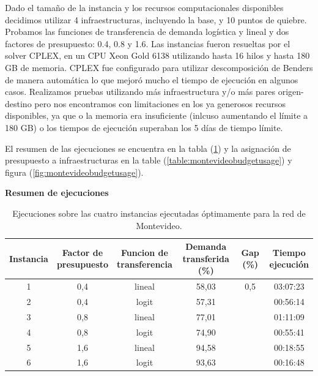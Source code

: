 \documentclass{article}
\begin{document}
  Dado el tamaño de la instancia y los recursos computacionales disponibles decidimos utilizar 4 infraestructuras, incluyendo la base, y 10 puntos de quiebre. Probamos las funciones de transferencia de demanda logística y lineal y dos factores de presupuesto: 0.4, 0.8 y 1.6. Las instancias fueron resueltas por el solver CPLEX, en un CPU Xeon Gold 6138 utilizando hasta 16 hilos y hasta 180 GB de memoria. CPLEX fue configurado para utilizar descomposición de Benders de manera automática lo que mejoró mucho el tiempo de ejecución en algunos casos. Realizamos pruebas utilizando más infraestructura y/o más pares origen-destino pero nos encontramos con limitaciones en los ya generosos recursos disponibles, ya que o la memoria era insuficiente (inlcuso aumentando el límite a 180 GB) o los tiempos de ejecución superaban los 5 días de tiempo límite.

  El resumen de las ejecuciones se encuentra en la tabla (\ref{table:montevideoexecutions}) y la asignación de presupuesto a infraestructuras en la table (\ref{table:montevideobudgetusage}) y figura (\ref{fig:montevideobudgetusage}).

  \begin{table}[h!]
    \centering
    \caption*{{\bf Resumen de ejecuciones}}
    \begin{tabular}{cccccc}
      \toprule
        Instancia & \shortstack{Factor de \\ presupuesto} & \shortstack{Funcion de \\ transferencia} & \shortstack{Demanda \\ transferida (\%)} & Gap (\%) & \shortstack{Tiempo \\ ejecución} \\
      \midrule
        1 & 0,4 & lineal & 58,03 & 0,5 & 03:07:23 \\
        2 & 0,4 & logit & 57,31 &  & 00:56:14 \\
        3 & 0,8 & lineal & 77,01 &  & 01:11:09 \\
        4 & 0,8 & logit & 74,90 &  & 00:55:41 \\
        5 & 1,6 & lineal & 94,58 &  & 00:18:55 \\
        6 & 1,6 & logit & 93,63 &  & 00:16:48 \\
      \bottomrule
    \end{tabular}
      \caption{Ejecuciones sobre las cuatro instancias ejecutadas óptimamente para la red de Montevideo.}\label{table:montevideoexecutions}
  \end{table}
\end{document}
